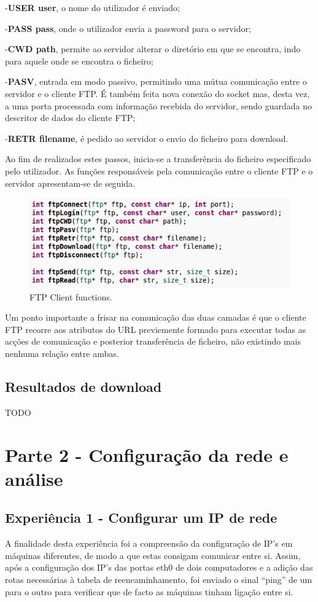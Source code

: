 \documentclass[a4paper]{article}
\begin{document}
 -\textbf{USER user}, o nome do utilizador é enviado;
 
 -\textbf{PASS pass}, onde o utilizador envia a password para o servidor;
 
 -\textbf{CWD path}, permite ao servidor alterar o diretório em que se encontra, indo para aquele onde se encontra o ficheiro;
 
 -\textbf{PASV}, entrada em modo passivo, permitindo uma mútua comunicação entre o servidor e o cliente FTP. É também feita nova conexão do socket mas, desta vez, a uma porta processada com informação recebida do servidor, sendo guardada no descritor de dados do cliente FTP;
 
 -\textbf{RETR filename}, é pedido ao servidor o envio do ficheiro para download.
 
Ao fim de realizados estes passos, inicia-se a transferência do ficheiro especificado pelo utilizador. As funções responsáveis pela comunicação entre o cliente FTP e o servidor apresentam-se de seguida.

\begin{figure}[h!]
\centering
\includegraphics[scale=0.5]{res/ftp-functions.png}
\caption{FTP Client functions.}
\end{figure}

Um ponto importante a frisar na comunicação das duas camadas é que o cliente FTP recorre aos atributos do URL previemente formado para executar todas as acções de comunicação e posterior transferência de ficheiro, não existindo mais nenhuma relação entre ambas.

\subsection{Resultados de download}
TODO

\section{Parte 2 - Configuração da rede e análise}
\subsection{Experiência 1 - Configurar um IP de rede}
A finalidade desta experiência foi a compreensão da configuração de IP’s em máquinas diferentes, de modo a que estas consigam comunicar entre si. Assim, após a configuração dos IP’s das portas eth0 de dois computadores e a adição das rotas necessárias à tabela de reencaminhamento, foi enviado o sinal “ping” de um para o outro para verificar que de facto as máquinas tinham ligação entre si.
\end{document}
